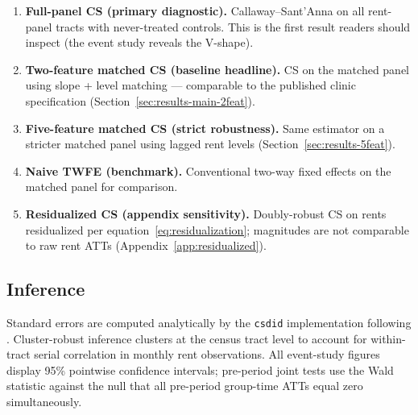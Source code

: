 \begin{enumerate}
  \item \textbf{Full-panel CS (primary diagnostic).} Callaway--Sant'Anna on all rent-panel tracts with never-treated controls. This is the first result readers should inspect (the event study reveals the V-shape).

  \item \textbf{Two-feature matched CS (baseline headline).} CS on the matched panel using slope + level matching --- comparable to the published clinic specification (Section~\ref{sec:results-main-2feat}).

  \item \textbf{Five-feature matched CS (strict robustness).} Same estimator on a stricter matched panel using lagged rent levels (Section~\ref{sec:results-5feat}).

  \item \textbf{Naive TWFE (benchmark).} Conventional two-way fixed effects on the matched panel for comparison.

  \item \textbf{Residualized CS (appendix sensitivity).} Doubly-robust CS on rents residualized per equation~\eqref{eq:residualization}; magnitudes are not comparable to raw rent ATTs (Appendix~\ref{app:residualized}).
\end{enumerate}

\subsection{Inference}

Standard errors are computed analytically by the \texttt{csdid} implementation following \citet{callaway2021difference}. Cluster-robust inference clusters at the census tract level to account for within-tract serial correlation in monthly rent observations. All event-study figures display 95\% pointwise confidence intervals; pre-period joint tests use the Wald statistic against the null that all pre-period group-time ATTs equal zero simultaneously.
